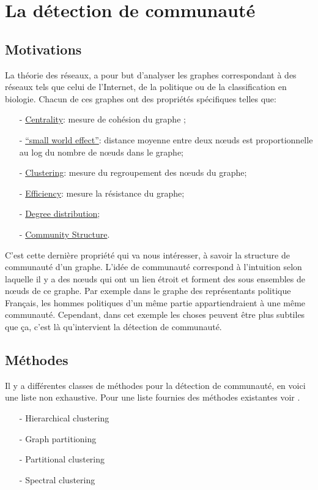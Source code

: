 \section{La détection de communauté}
\subsection{Motivations}
La théorie des réseaux, a pour but d'analyser les graphes correspondant à des réseaux tels que celui de l'Internet, de la politique ou de la classification en biologie.
Chacun de ces graphes ont des propriétés spécifiques telles que:
\begin{itemize}
 	\item[-] \underline{Centrality}: mesure de cohésion du graphe ;
 	\item[-] \underline{``small world effect''}:  distance moyenne entre deux nœuds est proportionnelle au log du nombre de nœuds dans le graphe;
 	\item[-] \underline{Clustering}: mesure du regroupement des nœuds du graphe;
 	\item[-] \underline{Efficiency}: mesure la résistance du graphe;
 	\item[-] \underline{Degree distribution}; 
 	\item[-] \underline{Community Structure}.\\
 \end{itemize}
C'est cette dernière propriété qui va nous intéresser, à savoir la structure de communauté d'un graphe.
L'idée de communauté correspond à l'intuition selon laquelle il y a des nœuds qui ont un lien étroit et forment des sous ensembles de nœuds de ce graphe.
Par exemple dans le graphe des représentants politique Français, les hommes politiques d'un même partie appartiendraient à une même communauté.
Cependant, dans cet exemple les choses peuvent être plus subtiles que ça, c'est là qu'intervient la détection de communauté.

\subsection{Méthodes}
Il y a différentes classes de méthodes pour la détection de communauté, en voici une liste non exhaustive.
Pour une liste fournies des méthodes existantes voir \cite{Community_detection_in_graphs}.
\begin{itemize}
	\item[-] Hierarchical clustering
	\item[-] Graph partitioning
	\item[-] Partitional clustering
	\item[-] Spectral clustering \\
\end{itemize}

